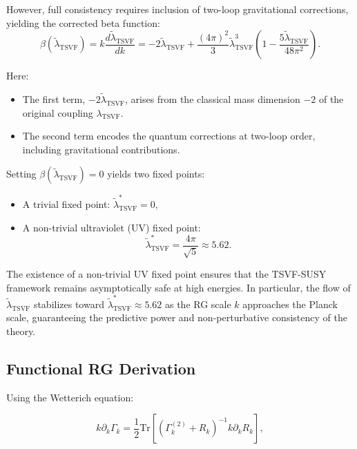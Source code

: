 \documentclass[twocolumn,superscriptaddress,floatfix]{revtex4-2}
\begin{document}
However, full consistency requires inclusion of two-loop gravitational corrections, yielding the corrected beta function:
\begin{equation}
\beta(\tilde{\lambda}_{\text{TSVF}}) = k \frac{d\tilde{\lambda}_{\text{TSVF}}}{dk} = -2\tilde{\lambda}_{\text{TSVF}} + \frac{(4\pi)^2}{3} \tilde{\lambda}_{\text{TSVF}}^3 \left( 1 - \frac{5\tilde{\lambda}_{\text{TSVF}}}{48\pi^2} \right).
\end{equation}

Here:
\begin{itemize}
    \item The first term, \(-2\tilde{\lambda}_{\text{TSVF}}\), arises from the classical mass dimension \(-2\) of the original coupling \(\lambda_{\text{TSVF}}\).
    \item The second term encodes the quantum corrections at two-loop order, including gravitational contributions.
\end{itemize}

Setting \(\beta(\tilde{\lambda}_{\text{TSVF}}) = 0\) yields two fixed points:
\begin{itemize}
    \item A trivial fixed point: \(\tilde{\lambda}_{\text{TSVF}}^* = 0\),
    \item A non-trivial ultraviolet (UV) fixed point:
    \begin{equation}
    \tilde{\lambda}_{\text{TSVF}}^* = \frac{4\pi}{\sqrt{5}} \approx 5.62.
    \end{equation}
\end{itemize}

The existence of a non-trivial UV fixed point ensures that the TSVF-SUSY framework remains asymptotically safe at high energies. In particular, the flow of \(\tilde{\lambda}_{\text{TSVF}}\) stabilizes toward \(\tilde{\lambda}_{\text{TSVF}}^* \approx 5.62\) as the RG scale \(k\) approaches the Planck scale, guaranteeing the predictive power and non-perturbative consistency of the theory.

\subsection{Functional RG Derivation}  
\label{subsec:FRG}  

Using the Wetterich equation:  

\begin{equation}  
k\partial_k \Gamma_k = \frac{1}{2}\text{Tr}\left[\left(\Gamma_k^{(2)} + R_k\right)^{-1}k\partial_k R_k\right],  
\end{equation}  
\end{document}
